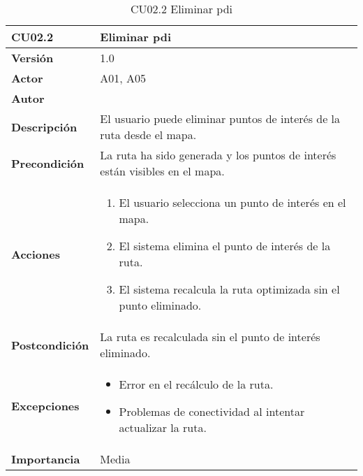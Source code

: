 \begin{table}[p]
	\centering
	\begin{tabularx}{\linewidth}{ p{} p{} }
		\toprule
		\textbf{CU02.2}    & \textbf{Eliminar \acrlong{pdi}} \\
		\toprule
		\textbf{Versión}              & 1.0    \\
		\textbf{Actor}                & A01, A05 \\
		\textbf{Autor}                & \autor \\
		\textbf{Descripción}          & El usuario puede eliminar puntos de interés de la ruta desde el mapa. \\
		\textbf{Precondición}         & La ruta ha sido generada y los puntos de interés están visibles en el mapa. \\
		\textbf{Acciones}             &
		\begin{enumerate}
			\def\labelenumi{\arabic{enumi}.}
			\tightlist
			\item El usuario selecciona un punto de interés en el mapa.
			\item El sistema elimina el punto de interés de la ruta.
			\item El sistema recalcula la ruta optimizada sin el punto eliminado.
		\end{enumerate}\\
		\textbf{Postcondición}        & La ruta es recalculada sin el punto de interés eliminado. \\
		\textbf{Excepciones}          & 
		\begin{itemize}
			\tightlist
			\item Error en el recálculo de la ruta.
			\item Problemas de conectividad al intentar actualizar la ruta.
		\end{itemize}\\
		\textbf{Importancia}          & Media \\
		\bottomrule
	\end{tabularx}
	\caption{CU02.2 Eliminar \acrlong{pdi}}
\end{table}

